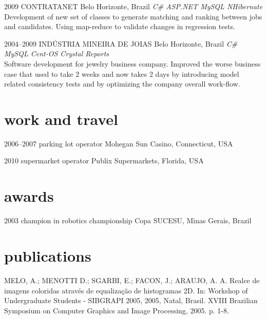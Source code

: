 \documentclass[]{friggeri-cv}
\begin{document}
\begin{entrylist}
\entry
{2009}
{CONTRATANET}
{Belo Horizonte, Brazil}
{\emph{\bullet C\# \bullet ASP.NET \bullet MySQL \bullet NHibernate } \\Development of new set of classes to generate matching and ranking between jobs and candidates. Using map-reduce to validate changes in regression tests. }


 \entry
 {2004--2009}
 {INDÚSTRIA MINEIRA DE JOIAS}
 {Belo Horizonte, Brazil}
 {\emph{\bullet C\# \bullet MySQL \bullet Cent-OS \bullet Crystal Reports } \\ Software development for jewelry business company.
  Improved the worse business case that used to take 2 weeks and now takes 2 days by introducing model related consistency tests and by optimizing the company overall work-flow. }


\end{entrylist}
\section{work and travel} 

\begin{entrylist}

\entry
{2006--2007}
{parking lot {\normalfont operator}}
{Mohegan Sun Casino, Connecticut, USA}

\entry
{2010} 
{supermarket {\normalfont operator}}
{Publix Supermarkets, Florida, USA}

\end{entrylist}


\section{awards}


\begin{entrylist}

\entry
{2003} 
{champion {\normalfont in robotics championship}}
{Copa SUCESU, Minas Gerais, Brazil}

\end{entrylist}

\section{publications}

MELO, A.; MENOTTI D.; SGARBI, E.; FACON, J.; ARAUJO, A. A. Realce de imagens coloridas através de equalização de histogramas 2D. In: Workshop of Undergraduate Students - SIBGRAPI 2005, 2005, Natal, Brasil. XVIII Brazilian Symposium on Computer Graphics and Image Processing, 2005. p. 1-8.
\end{document}

